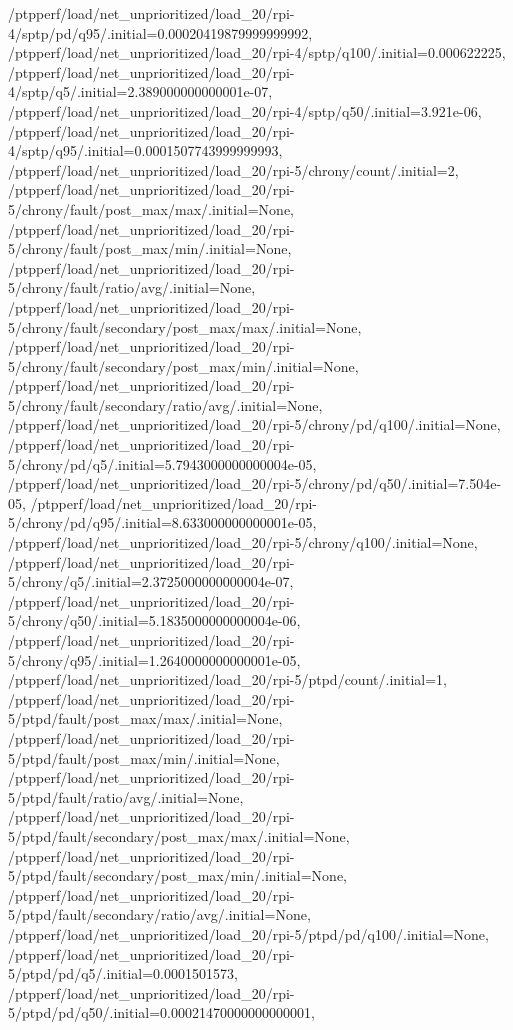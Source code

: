 {    /ptpperf/load/net_unprioritized/load_20/rpi-4/sptp/pd/q95/.initial=0.00020419879999999992,
    /ptpperf/load/net_unprioritized/load_20/rpi-4/sptp/q100/.initial=0.000622225,
    /ptpperf/load/net_unprioritized/load_20/rpi-4/sptp/q5/.initial=2.389000000000001e-07,
    /ptpperf/load/net_unprioritized/load_20/rpi-4/sptp/q50/.initial=3.921e-06,
    /ptpperf/load/net_unprioritized/load_20/rpi-4/sptp/q95/.initial=0.0001507743999999993,
    /ptpperf/load/net_unprioritized/load_20/rpi-5/chrony/count/.initial=2,
    /ptpperf/load/net_unprioritized/load_20/rpi-5/chrony/fault/post_max/max/.initial=None,
    /ptpperf/load/net_unprioritized/load_20/rpi-5/chrony/fault/post_max/min/.initial=None,
    /ptpperf/load/net_unprioritized/load_20/rpi-5/chrony/fault/ratio/avg/.initial=None,
    /ptpperf/load/net_unprioritized/load_20/rpi-5/chrony/fault/secondary/post_max/max/.initial=None,
    /ptpperf/load/net_unprioritized/load_20/rpi-5/chrony/fault/secondary/post_max/min/.initial=None,
    /ptpperf/load/net_unprioritized/load_20/rpi-5/chrony/fault/secondary/ratio/avg/.initial=None,
    /ptpperf/load/net_unprioritized/load_20/rpi-5/chrony/pd/q100/.initial=None,
    /ptpperf/load/net_unprioritized/load_20/rpi-5/chrony/pd/q5/.initial=5.7943000000000004e-05,
    /ptpperf/load/net_unprioritized/load_20/rpi-5/chrony/pd/q50/.initial=7.504e-05,
    /ptpperf/load/net_unprioritized/load_20/rpi-5/chrony/pd/q95/.initial=8.633000000000001e-05,
    /ptpperf/load/net_unprioritized/load_20/rpi-5/chrony/q100/.initial=None,
    /ptpperf/load/net_unprioritized/load_20/rpi-5/chrony/q5/.initial=2.3725000000000004e-07,
    /ptpperf/load/net_unprioritized/load_20/rpi-5/chrony/q50/.initial=5.1835000000000004e-06,
    /ptpperf/load/net_unprioritized/load_20/rpi-5/chrony/q95/.initial=1.2640000000000001e-05,
    /ptpperf/load/net_unprioritized/load_20/rpi-5/ptpd/count/.initial=1,
    /ptpperf/load/net_unprioritized/load_20/rpi-5/ptpd/fault/post_max/max/.initial=None,
    /ptpperf/load/net_unprioritized/load_20/rpi-5/ptpd/fault/post_max/min/.initial=None,
    /ptpperf/load/net_unprioritized/load_20/rpi-5/ptpd/fault/ratio/avg/.initial=None,
    /ptpperf/load/net_unprioritized/load_20/rpi-5/ptpd/fault/secondary/post_max/max/.initial=None,
    /ptpperf/load/net_unprioritized/load_20/rpi-5/ptpd/fault/secondary/post_max/min/.initial=None,
    /ptpperf/load/net_unprioritized/load_20/rpi-5/ptpd/fault/secondary/ratio/avg/.initial=None,
    /ptpperf/load/net_unprioritized/load_20/rpi-5/ptpd/pd/q100/.initial=None,
    /ptpperf/load/net_unprioritized/load_20/rpi-5/ptpd/pd/q5/.initial=0.0001501573,
    /ptpperf/load/net_unprioritized/load_20/rpi-5/ptpd/pd/q50/.initial=0.00021470000000000001,
}
